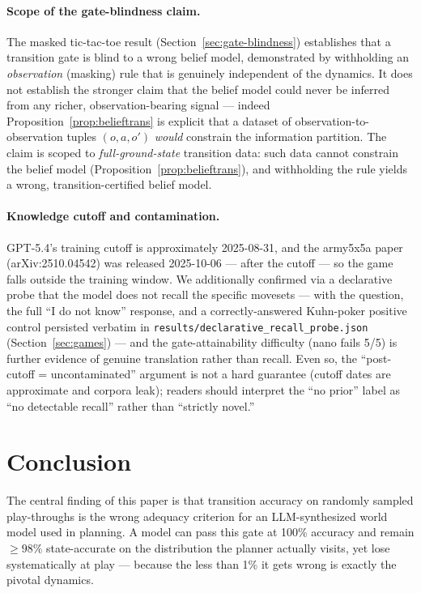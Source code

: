 \documentclass[11pt]{article}
\theoremstyle{remark}
\begin{document}
\paragraph{Scope of the gate-blindness claim.} The masked tic-tac-toe result (Section~\ref{sec:gate-blindness}) establishes that a transition gate is blind to a wrong belief model, demonstrated by withholding an \emph{observation} (masking) rule that is genuinely independent of the dynamics. It does not establish the stronger claim that the belief model could never be inferred from any richer, observation-bearing signal --- indeed Proposition~\ref{prop:belieftrans} is explicit that a dataset of observation-to-observation tuples $(o,a,o')$ \emph{would} constrain the information partition. The claim is scoped to \emph{full-ground-state} transition data: such data cannot constrain the belief model (Proposition~\ref{prop:belieftrans}), and withholding the rule yields a wrong, transition-certified belief model.

\paragraph{Knowledge cutoff and contamination.} GPT-5.4's training cutoff is approximately 2025-08-31, and the army5x5a paper (arXiv:2510.04542) was released 2025-10-06 --- after the cutoff --- so the game falls outside the training window. We additionally confirmed via a declarative probe that the model does not recall the specific movesets --- with the question, the full ``I do not know'' response, and a correctly-answered Kuhn-poker positive control persisted verbatim in \texttt{results/declarative\_recall\_probe.json} (Section~\ref{sec:games}) --- and the gate-attainability difficulty (nano fails 5/5) is further evidence of genuine translation rather than recall. Even so, the ``post-cutoff = uncontaminated'' argument is not a hard guarantee (cutoff dates are approximate and corpora leak); readers should interpret the ``no prior'' label as ``no detectable recall'' rather than ``strictly novel.''

\section{Conclusion}

The central finding of this paper is that transition accuracy on randomly sampled play-throughs is the wrong adequacy criterion for an LLM-synthesized world model used in planning. A model can pass this gate at 100\% accuracy and remain $\geq 98\%$ state-accurate on the distribution the planner actually visits, yet lose systematically at play --- because the less than 1\% it gets wrong is exactly the pivotal dynamics.
\end{document}
